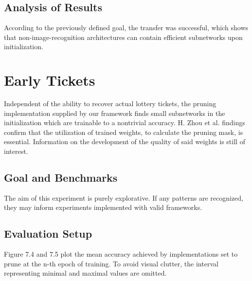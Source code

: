\subsection*{Analysis of Results}
According to the previously defined goal, the transfer was successful, which shows that non-image-recognition architectures can contain efficient subnetworks upon initialization.

\newpage

\section{Early Tickets}
Independent of the ability to recover actual lottery tickets, the pruning implementation supplied by our framework finds small subnetworks in the initialization which are trainable to a nontrivial accuracy. H. Zhou et al. findings confirm that the utilization of trained weights, to calculate the pruning mask, is essential.\cite{Deconstructing_LTH} Information on the development of the quality of said weights is still of interest. 
\subsection*{Goal and Benchmarks}
The aim of this experiment is purely explorative. If any patterns are recognized, they may inform experiments implemented with valid frameworks.
\subsection*{Evaluation Setup}
Figure 7.4 and 7.5 plot the mean accuracy achieved by implementations set to prune at the n-th epoch of training. To avoid visual clutter, the interval representing minimal and maximal values are omitted. 
